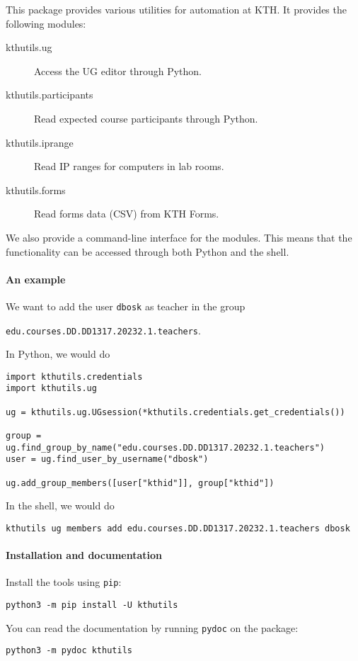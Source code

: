 This package provides various utilities for automation at KTH.
It provides the following modules:
\begin{description}
  \item[kthutils.ug] Access the UG editor through Python.
  \item[kthutils.participants] Read expected course participants through 
    Python.
  \item[kthutils.iprange] Read IP ranges for computers in lab rooms.
  \item[kthutils.forms] Read forms data (CSV) from KTH Forms.
\end{description}

We also provide a command-line interface for the modules.
This means that the functionality can be accessed through both Python and the 
shell.

\paragraph{An example}

We want to add the user \texttt{dbosk} as teacher in the 
group
\begin{center}
  \texttt{edu.courses.DD.DD1317.20232.1.teachers}.
\end{center}

In Python, we would do
\begin{verbatim}
import kthutils.credentials
import kthutils.ug

ug = kthutils.ug.UGsession(*kthutils.credentials.get_credentials())

group = ug.find_group_by_name("edu.courses.DD.DD1317.20232.1.teachers")
user = ug.find_user_by_username("dbosk")

ug.add_group_members([user["kthid"]], group["kthid"])
\end{verbatim}

In the shell, we would do
\begin{verbatim}
kthutils ug members add edu.courses.DD.DD1317.20232.1.teachers dbosk
\end{verbatim}

\paragraph{Installation and documentation}

Install the tools using \texttt{pip}:
\begin{verbatim}
python3 -m pip install -U kthutils
\end{verbatim}

You can read the documentation by running \texttt{pydoc} on the package:
\begin{verbatim}
python3 -m pydoc kthutils
\end{verbatim}
